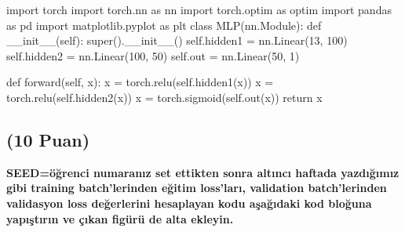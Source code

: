 \documentclass[11pt]{article}
\begin{document}
\begin{python}



import torch
import torch.nn as nn
import torch.optim as optim
import pandas as pd
import matplotlib.pyplot as plt
class MLP(nn.Module):
    def __init__(self):
        super().__init__()
        self.hidden1 = nn.Linear(13, 100)
        self.hidden2 = nn.Linear(100, 50)
        self.out = nn.Linear(50, 1)

    def forward(self, x):
        x = torch.relu(self.hidden1(x))
        x = torch.relu(self.hidden2(x))
        x = torch.sigmoid(self.out(x))
        return x
\end{python}

\subsection{(10 Puan)} \textbf{SEED=öğrenci numaranız set ettikten sonra altıncı haftada yazdığımız gibi training batch'lerinden eğitim loss'ları, validation batch'lerinden validasyon loss değerlerini hesaplayan kodu aşağıdaki kod bloğuna yapıştırın ve çıkan figürü de alta ekleyin.}
\end{document}
